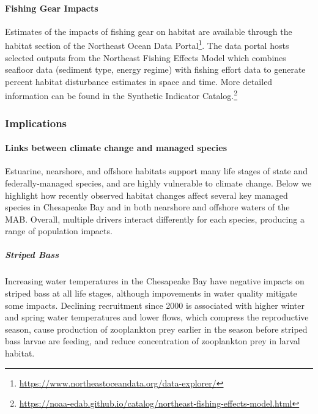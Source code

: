 \documentclass[
  10pt,
]{article}
\begin{document}
\hypertarget{fishing-gear-impacts}{%
\paragraph{Fishing Gear Impacts}\label{fishing-gear-impacts}}

Estimates of the impacts of fishing gear on habitat are available
through the habitat section of the Northeast Ocean Data
Portal\footnote{\url{https://www.northeastoceandata.org/data-explorer/}}.
The data portal hosts selected outputs from the Northeast Fishing
Effects Model which combines seafloor data (sediment type, energy
regime) with fishing effort data to generate percent habitat disturbance
estimates in space and time. More detailed information can be found in
the Synthetic Indicator Catalog.\footnote{\url{https://noaa-edab.github.io/catalog/northeast-fishing-effects-model.html}}

\hypertarget{implications-6}{%
\subsubsection{Implications}\label{implications-6}}

\hypertarget{links-between-climate-change-and-managed-species}{%
\paragraph{Links between climate change and managed
species}\label{links-between-climate-change-and-managed-species}}

Estuarine, nearshore, and offshore habitats support many life stages of
state and federally-managed species, and are highly vulnerable to
climate change. Below we highlight how recently observed habitat changes
affect several key managed species in Chesapeake Bay and in both
nearshore and offshore waters of the MAB. Overall, multiple drivers
interact differently for each species, producing a range of population
impacts.

\hypertarget{striped-bass}{%
\subparagraph{\texorpdfstring{\emph{Striped
Bass}}{Striped Bass}}\label{striped-bass}}

Increasing water temperatures in the Chesapeake Bay have negative
impacts on striped bass at all life stages, although impovements in
water quality mitigate some impacts. Declining recruitment since 2000 is
associated with higher winter and spring water temperatures and lower
flows, which compress the reproductive season, cause production of
zooplankton prey earlier in the season before striped bass larvae are
feeding, and reduce concentration of zooplankton prey in larval habitat.
\end{document}
